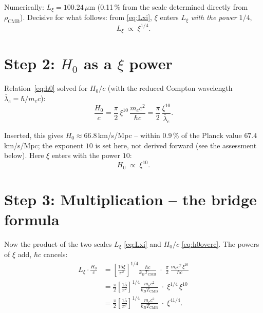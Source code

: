\begin{keyresult}
Numerically: $L_\xi = 100.24\,\mu$m (0.11\,\% from the scale determined
directly from $\rho_\text{CMB}$). Decisive for what follows: from
\eqref{eq:Lxi}, $\xi$ enters $L_\xi$ \emph{with the power $1/4$},
\[
  L_\xi \;\propto\; \xi^{1/4}.
\]
\end{keyresult}

\section{Step 2: $H_0$ as a $\xi$ power}

Relation~\eqref{eq:h0} solved for $H_0/c$ (with the reduced Compton wavelength
$\bar\lambda_e=\hbar/m_ec$):
\begin{equation}
  \frac{H_0}{c} = \frac{\pi}{2}\,\xi^{10}\,\frac{m_e c^2}{\hbar c}
  = \frac{\pi}{2}\,\frac{\xi^{10}}{\bar\lambda_e}.
  \label{eq:h0overc}
\end{equation}

\begin{keyresult}[$H_0$ exponent $10$]
Inserted, this gives $H_0 \approx 66.8$\,km/s/Mpc -- within $0.9\,\%$ of the
Planck value $67.4$\,km/s/Mpc; the exponent $10$ is set here, not derived
forward (see the assessment below). Here $\xi$ enters with
the power $10$:
\[
  H_0 \;\propto\; \xi^{10}.
\]
\end{keyresult}

\section{Step 3: Multiplication -- the bridge formula}

Now the product of the two scales $L_\xi$ \eqref{eq:Lxi} and $H_0/c$
\eqref{eq:h0overc}. The powers of $\xi$ add, $\hbar c$ cancels:
\begin{align}
  L_\xi\cdot\frac{H_0}{c}
  &= \left[\frac{15\xi}{\pi^2}\right]^{1/4}\frac{\hbar c}{k_BT_\text{CMB}}
     \;\cdot\; \frac{\pi}{2}\,\frac{m_ec^2\,\xi^{10}}{\hbar c}
     \nonumber\\[4pt]
  &= \frac{\pi}{2}\left[\frac{15}{\pi^2}\right]^{1/4}
     \frac{m_ec^2}{k_BT_\text{CMB}}\;\cdot\;\xi^{1/4}\,\xi^{10}
     \nonumber\\[4pt]
  &= \frac{\pi}{2}\left[\frac{15}{\pi^2}\right]^{1/4}
     \frac{m_ec^2}{k_BT_\text{CMB}}\;\cdot\;\xi^{41/4}.
  \label{eq:bridgederiv}
\end{align}

